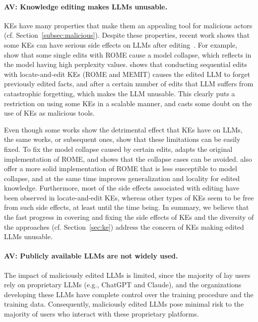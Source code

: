     

\paragraph{AV: Knowledge editing makes LLMs unusable.}
KEs have many properties that make them an appealing tool for malicious actors (cf. Section~\ref{subsec:malicious}). Despite these properties, recent work shows that some KEs can have serious side effects on LLMs after editing~\cite{gupta-etal-2024-model, yang-etal-2024-fall,wang-etal-2024-better}. For example, \citet{yang-etal-2024-fall} show that some single edits with ROME cause a model collapse, which reflects in the model having high perplexity values. \citet{gupta-etal-2024-model} shows that conducting sequential edits with locate-and-edit KEs (ROME and MEMIT) causes the edited LLM to forget previously edited facts, and after a certain number of edits that LLM suffers from catastrophic forgetting, which makes the LLM unusable. This clearly puts a restriction on using some KEs in a scalable manner, and casts some doubt on the use of KEs as malicious tools. 

Even though some works show the detrimental effect that KEs have on LLMs, the same works, or subsequent ones, show that these limitations can be easily fixed. To fix the model collapse caused by certain edits, \citet{yang-etal-2024-fall} adapts the original implementation of ROME, and shows that the collapse cases can be avoided. \citet{gupta-etal-2024-rebuilding} also offer a more solid implementation of ROME that is less susceptible to model collapse, and at the same time improves generalization and locality for edited knowledge. Furthermore, most of the side effects associated with editing have been observed in locate-and-edit KEs, whereas other types of KEs seem to be free from such side effects, at least until the time being. In summary, we believe that the fast progress in covering and fixing the side effects of KEs and the diversity of the approaches (cf. Section~\ref{sec:ke}) address the concern of KEs making edited LLMs unusable.






\paragraph{AV: Publicly available LLMs are not widely used.}
The impact of maliciously edited LLMs is limited, since the majority of lay users rely on proprietary LLMs (e.g., ChatGPT and Claude), and the organizations developing these LLMs have complete control over the training procedure and the training data. Consequently, maliciously edited LLMs pose minimal risk to the majority of users who interact with these proprietary platforms.

